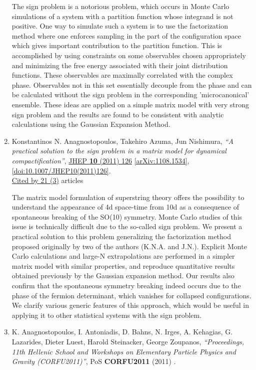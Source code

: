 \documentclass[a4paper,10pt]{article}
\begin{document}
\begin{enumerate}
The sign problem is a notorious problem, which occurs in Monte Carlo simulations of a system with a partition function whose integrand is not positive. One way to simulate such a system is to use the factorization method where one enforces sampling in the part of the configuration space which gives important contribution to the partition function. This is accomplished by using constraints on some observables chosen appropriately and minimizing the free energy associated with their joint distribution functions. These observables are maximally correlated with the complex phase. Observables not in this set essentially decouple from the phase and can be calculated without the sign problem in the corresponding 'microcanonical' ensemble. These ideas are applied on a simple matrix model with very strong sign problem and the results are found to be consistent with analytic calculations using the Gaussian Expansion Method.
\item Konstantinos N. Anagnostopoulos, Takehiro Azuma, Jun Nishimura, {\it ``A practical solution to the sign problem in a matrix model for dynamical compactification''}, \href{https://www.doi.org/10.1007/JHEP10(2011)126}{JHEP {\bf 10} (2011) 126} \href{https://arxiv.org/abs/1108.1534}{[arXiv:1108.1534]}, \href{https://www.doi.org/10.1007/JHEP10(2011)126}{[doi:10.1007/JHEP10(2011)126]}.
\\\href{https://inspirehep.net/literature/?q=refersto%3Arecid%3A922419}{Cited by 21 (3)} articles

The matrix model formulation of superstring theory offers the possibility to understand the appearance of 4d space-time from 10d as a consequence of spontaneous breaking of the SO(10) symmetry. Monte Carlo studies of this issue is technically difficult due to the so-called sign problem. We present a practical solution to this problem generalizing the factorization method proposed originally by two of the authors (K.N.A. and J.N.). Explicit Monte Carlo calculations and large-N extrapolations are performed in a simpler matrix model with similar properties, and reproduce quantitative results obtained previously by the Gaussian expansion method. Our results also confirm that the spontaneous symmetry breaking indeed occurs due to the phase of the fermion determinant, which vanishes for collapsed configurations. We clarify various generic features of this approach, which would be useful in applying it to other statistical systems with the sign problem.
\item K. Anagnostopoulos, I. Antoniadis, D. Bahns, N. Irges, A. Kehagias, G. Lazarides, Dieter Luest, Harold Steinacker, George Zoupanos, {\it ``Proceedings, 11th Hellenic School and Workshops on Elementary Particle Physics and Gravity (CORFU2011)''}, PoS {\bf CORFU2011} (2011) .



\end{enumerate}
\end{document}
